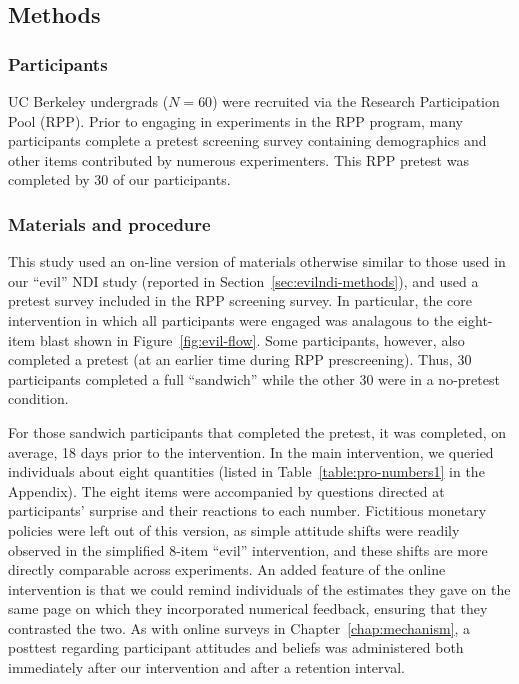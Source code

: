 \subsection{Methods}

\subsubsection{Participants}

UC Berkeley undergrads ($N=60$) were recruited via the Research Participation
Pool (RPP). Prior to engaging in experiments in the RPP program, many
participants complete a pretest screening survey containing demographics and
other items contributed by numerous experimenters. This RPP pretest was
completed by 30 of our participants. 

\subsubsection{Materials and procedure}

This study used an on-line version of materials otherwise similar to those used
in our “evil” NDI study (reported in Section~\ref{sec:evilndi-methods}), and
used a pretest survey included in the RPP screening survey. In particular, the
core intervention in which all participants were engaged was analagous to the
eight-item blast shown in Figure~\ref{fig:evil-flow}. Some participants,
however, also completed a pretest (at an earlier time during RPP prescreening).
Thus, 30 participants completed a full “sandwich” while the other 30 were in a
no-pretest condition. 

For those sandwich participants that completed the pretest, it was completed, on
average, 18 days prior to the intervention. In the main intervention, we queried
individuals about eight quantities (listed in Table~\ref{table:pro-numbers1} in
the Appendix). The eight items were accompanied by questions directed at
participants’ surprise and their reactions to each number.  Fictitious monetary
policies were left out of this version, as simple attitude shifts were readily
observed in the simplified 8-item “evil” intervention, and these shifts are more
directly comparable across experiments.  An added feature of the online
intervention is that we could remind individuals of the estimates they gave on
the same page on which they incorporated numerical feedback, ensuring that they
contrasted the two. As with online surveys in Chapter~\ref{chap:mechanism}, a
posttest regarding participant attitudes and beliefs was administered both
immediately after our intervention and after a retention interval.


